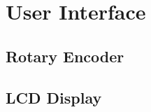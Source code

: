 \setchapterpreamble[u]{\margintoc}

\chapter{User Interface}
\label{ch:user-interface}

\section{Rotary Encoder}

\section{LCD Display}